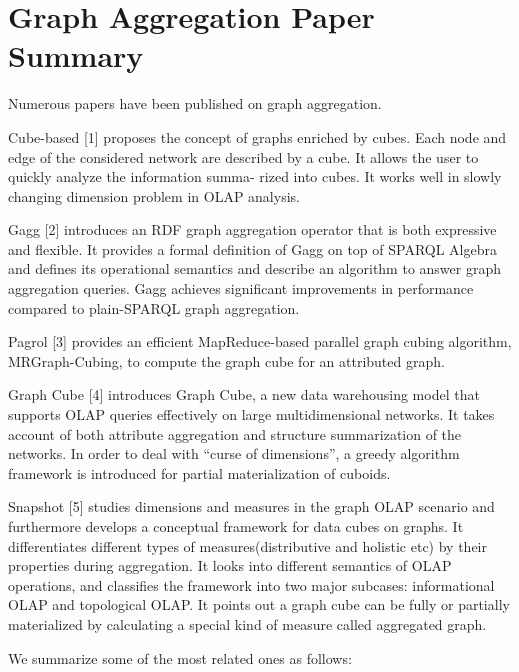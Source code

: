 \section{Graph Aggregation Paper Summary}

Numerous papers have been published on graph aggregation. 

Cube-based [1] proposes the concept of  graphs enriched by cubes. Each node and edge of the considered network are described by a cube. It allows the user to quickly analyze the information summa-
rized into cubes. It works well in slowly changing dimension problem in OLAP analysis.

Gagg [2] introduces an RDF graph aggregation operator that is both expressive and flexible. It provides a formal definition of Gagg on top of SPARQL Algebra and defines its operational semantics and describe an algorithm to answer graph aggregation queries. Gagg achieves significant improvements in performance compared to plain-SPARQL graph aggregation.

Pagrol [3] provides an efficient MapReduce-based parallel graph
cubing algorithm, MRGraph-Cubing, to compute the graph cube
for an attributed graph. 

Graph Cube [4] introduces Graph Cube, a new data warehousing model that supports OLAP queries effectively on large multidimensional networks. It takes account of both attribute aggregation and structure summarization of the networks. In order to deal with “curse of dimensions”, a greedy algorithm framework is introduced for partial materialization of cuboids.

Snapshot [5] studies dimensions and measures in the graph OLAP scenario and furthermore develops a conceptual framework for data cubes on graphs. It differentiates different types of measures(distributive and holistic etc) by their properties during aggregation. It looks into different semantics of OLAP operations, and classifies the framework into two major subcases: informational OLAP and topological OLAP. It points out a graph cube can be fully or partially materialized by calculating a special kind of measure called aggregated graph. 


We summarize some of the most related ones as follows:
 
